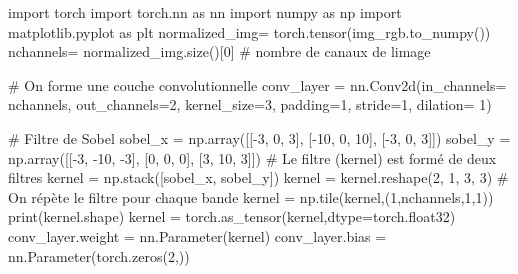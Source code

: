 \documentclass[
  11pt,
  letterpaper,
  open=any,
  twoside=false,
  french]{scrbook}
\newenvironment{Shaded}{\begin{snugshade}}{\end{snugshade}}
\newcommand{\BuiltInTok}[1]{\textcolor[rgb]{0.00,0.23,0.31}{#1}}
\newcommand{\CommentTok}[1]{\textcolor[rgb]{0.37,0.37,0.37}{#1}}
\newcommand{\DecValTok}[1]{\textcolor[rgb]{0.68,0.00,0.00}{#1}}
\newcommand{\ImportTok}[1]{\textcolor[rgb]{0.00,0.46,0.62}{#1}}
\newcommand{\NormalTok}[1]{\textcolor[rgb]{0.00,0.23,0.31}{#1}}
\newcommand{\OperatorTok}[1]{\textcolor[rgb]{0.37,0.37,0.37}{#1}}
\begin{document}
\begin{Shaded}
\begin{Highlighting}[]
\ImportTok{import}\NormalTok{ torch}
\ImportTok{import}\NormalTok{ torch.nn }\ImportTok{as}\NormalTok{ nn}
\ImportTok{import}\NormalTok{ numpy }\ImportTok{as}\NormalTok{ np}
\ImportTok{import}\NormalTok{ matplotlib.pyplot }\ImportTok{as}\NormalTok{ plt}
\NormalTok{normalized\_img}\OperatorTok{=}\NormalTok{ torch.tensor(img\_rgb.to\_numpy())}
\NormalTok{nchannels}\OperatorTok{=}\NormalTok{ normalized\_img.size()[}\DecValTok{0}\NormalTok{] }\CommentTok{\# nombre de canaux de l\textquotesingle{}image}

\CommentTok{\# On forme une couche convolutionnelle}
\NormalTok{conv\_layer }\OperatorTok{=}\NormalTok{ nn.Conv2d(in\_channels}\OperatorTok{=}\NormalTok{ nchannels, out\_channels}\OperatorTok{=}\DecValTok{2}\NormalTok{, kernel\_size}\OperatorTok{=}\DecValTok{3}\NormalTok{, padding}\OperatorTok{=}\DecValTok{1}\NormalTok{, stride}\OperatorTok{=}\DecValTok{1}\NormalTok{, dilation}\OperatorTok{=} \DecValTok{1}\NormalTok{)}

\CommentTok{\# Filtre de Sobel}
\NormalTok{sobel\_x }\OperatorTok{=}\NormalTok{ np.array([[}\OperatorTok{{-}}\DecValTok{3}\NormalTok{, }\DecValTok{0}\NormalTok{, }\DecValTok{3}\NormalTok{], [}\OperatorTok{{-}}\DecValTok{10}\NormalTok{, }\DecValTok{0}\NormalTok{, }\DecValTok{10}\NormalTok{], [}\OperatorTok{{-}}\DecValTok{3}\NormalTok{, }\DecValTok{0}\NormalTok{, }\DecValTok{3}\NormalTok{]])}
\NormalTok{sobel\_y }\OperatorTok{=}\NormalTok{ np.array([[}\OperatorTok{{-}}\DecValTok{3}\NormalTok{, }\OperatorTok{{-}}\DecValTok{10}\NormalTok{, }\OperatorTok{{-}}\DecValTok{3}\NormalTok{], [}\DecValTok{0}\NormalTok{, }\DecValTok{0}\NormalTok{, }\DecValTok{0}\NormalTok{], [}\DecValTok{3}\NormalTok{, }\DecValTok{10}\NormalTok{, }\DecValTok{3}\NormalTok{]])}
\CommentTok{\# Le filtre (kernel) est formé de deux filtres}
\NormalTok{kernel }\OperatorTok{=}\NormalTok{ np.stack([sobel\_x, sobel\_y])}
\NormalTok{kernel }\OperatorTok{=}\NormalTok{ kernel.reshape(}\DecValTok{2}\NormalTok{, }\DecValTok{1}\NormalTok{, }\DecValTok{3}\NormalTok{, }\DecValTok{3}\NormalTok{)}
\CommentTok{\# On répète le filtre pour chaque bande}
\NormalTok{kernel }\OperatorTok{=}\NormalTok{ np.tile(kernel,(}\DecValTok{1}\NormalTok{,nchannels,}\DecValTok{1}\NormalTok{,}\DecValTok{1}\NormalTok{))}
\BuiltInTok{print}\NormalTok{(kernel.shape)}
\NormalTok{kernel }\OperatorTok{=}\NormalTok{ torch.as\_tensor(kernel,dtype}\OperatorTok{=}\NormalTok{torch.float32)}
\NormalTok{conv\_layer.weight }\OperatorTok{=}\NormalTok{ nn.Parameter(kernel)}
\NormalTok{conv\_layer.bias }\OperatorTok{=}\NormalTok{ nn.Parameter(torch.zeros(}\DecValTok{2}\NormalTok{,))}


\end{Highlighting}
\end{Shaded}
\end{document}
